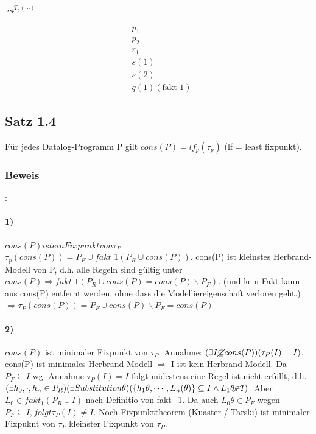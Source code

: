 \documentclass[12pt, a4paper]{article}
\begin{document}
$\leadsto^{T_p(\cdots)}$

\begin{equation}
\begin{split}
&p_1\\
&p_2 \\
&r_1\\
&s(1) \\
&s(2) \\
&q(1) (\text{fakt\_1})
\end{split}
\end{equation}

\subsection*{Satz 1.4} Für jedes Datalog-Programm P gilt $cons(P) = lf_p(\tau_p)$ (lf = least fixpunkt).

\subsubsection*{Beweis}:
\paragraph{1)} $cons(P) ist ein Fixpunkt von \tau_P$. \\
$\tau_p(cons(P)) = P_F \cup fakt\_1(P_R \cup cons(P))$. cons(P) ist kleinstes Herbrand-Modell von P, d.h. alle Regeln sind gültig unter $cons(P) \Rightarrow fakt\_1(P_R \cup cons(P) = cons(P) \backslash P_F)$. (und kein Fakt kann aus cons(P) entfernt werden, ohne dass die Modelliereigenschaft verloren geht.) $\Rightarrow \tau_P(cons(P)) = P_F \cup cons(P) \backslash P_F = cons(P)$

\paragraph{2)} $cons(P)$ ist minimaler Fixpunkt von $\tau_P$.
Annahme: $(\exists I \cancel{\subseteq} cons(P))(\tau_P(I) = I)$.
cons(P) ist minimales Herbrand-Modell $\Rightarrow$ I ist kein Herbrand-Modell. Da $P_F \subseteq I$ wg. Annahme $\tau_P(I) = I$ folgt midestens eine Regel ist nicht erfüllt, d.h. $(\exists h_0, \cdot,h_n \in P_R)(\exists Substitution \theta)(\{ h_1\theta, \cdots, L_n(\theta)\} \subseteq I \wedge L_1 \theta \cancel{\in} I)$. Aber $L_0 \in fakt_1(P_R \cup I)$ nach Definitio von fakt\_1.
Da auch $L_0 \theta \in P_F$ wegen $P_F \subseteq I, folgt \tau_P(I) \neq I$. Noch Fixpunkttheorem (Kuaster / Tarski) ist minimaler Fixpuknt von $\tau_P$ kleinster Fixpunkt von $\tau_P$. 
\end{document}
